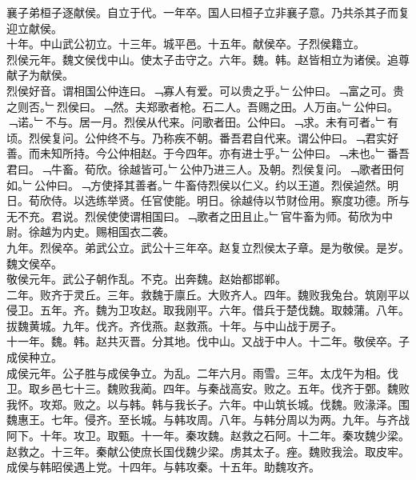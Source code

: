 \documentclass{zhvt-classic}
\begin{document}
\hspace*{2em}襄子弟桓子逐献侯。自立于代。一年卒。国人曰桓子立非襄子意。乃共杀其子而复迎立献侯。\\
\hspace*{2em}十年。中山武公初立。十三年。城平邑。十五年。献侯卒。子烈侯籍立。\\
\hspace*{2em}烈侯元年。魏文侯伐中山。使太子击守之。六年。魏。韩。赵皆相立为诸侯。追尊献子为献侯。\\
\hspace*{2em}烈侯好音。谓相国公仲连曰。﹁寡人有爱。可以贵之乎。﹂公仲曰。﹁富之可。贵之则否。﹂烈侯曰。﹁然。夫郑歌者枪。石二人。吾赐之田。人万亩。﹂公仲曰。﹁诺。﹂不与。居一月。烈侯从代来。问歌者田。公仲曰。﹁求。未有可者。﹂有顷。烈侯复问。公仲终不与。乃称疾不朝。番吾君自代来。谓公仲曰。﹁君实好善。而未知所持。今公仲相赵。于今四年。亦有进士乎。﹂公仲曰。﹁未也。﹂番吾君曰。﹁牛畜。荀欣。徐越皆可。﹂公仲乃进三人。及朝。烈侯复问。﹁歌者田何如。﹂公仲曰。﹁方使择其善者。﹂牛畜侍烈侯以仁义。约以王道。烈侯逌然。明日。荀欣侍。以选练举贤。任官使能。明日。徐越侍以节财俭用。察度功德。所与无不充。君说。烈侯使使谓相国曰。﹁歌者之田且止。﹂官牛畜为师。荀欣为中尉。徐越为内史。赐相国衣二袭。\\
\hspace*{2em}九年。烈侯卒。弟武公立。武公十三年卒。赵复立烈侯太子章。是为敬侯。是岁。魏文侯卒。\\
\hspace*{2em}敬侯元年。武公子朝作乱。不克。出奔魏。赵始都邯郸。\\
\hspace*{2em}二年。败齐于灵丘。三年。救魏于廪丘。大败齐人。四年。魏败我兔台。筑刚平以侵卫。五年。齐。魏为卫攻赵。取我刚平。六年。借兵于楚伐魏。取棘蒲。八年。拔魏黄城。九年。伐齐。齐伐燕。赵救燕。十年。与中山战于房子。\\
\hspace*{2em}十一年。魏。韩。赵共灭晋。分其地。伐中山。又战于中人。十二年。敬侯卒。子成侯种立。\\
\hspace*{2em}成侯元年。公子胜与成侯争立。为乱。二年六月。雨雪。三年。太戊午为相。伐卫。取乡邑七十三。魏败我蔺。四年。与秦战高安。败之。五年。伐齐于鄄。魏败我怀。攻郑。败之。以与韩。韩与我长子。六年。中山筑长城。伐魏。败湪泽。围魏惠王。七年。侵齐。至长城。与韩攻周。八年。与韩分周以为两。九年。与齐战阿下。十年。攻卫。取甄。十一年。秦攻魏。赵救之石阿。十二年。秦攻魏少梁。赵救之。十三年。秦献公使庶长国伐魏少梁。虏其太子。痤。魏败我浍。取皮牢。成侯与韩昭侯遇上党。十四年。与韩攻秦。十五年。助魏攻齐。\\
\end{document}
